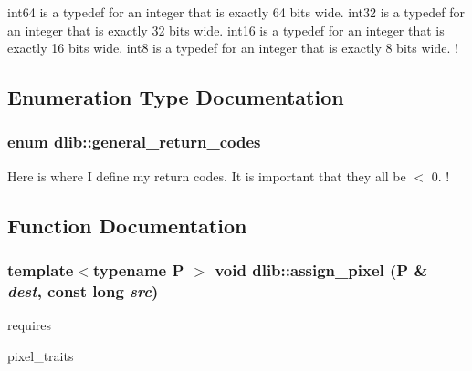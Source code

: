 int64 is a typedef for an integer that is exactly 64 bits wide. int32 is a typedef for an integer that is exactly 32 bits wide. int16 is a typedef for an integer that is exactly 16 bits wide. int8 is a typedef for an integer that is exactly 8 bits wide. ! 

\subsection{Enumeration Type Documentation}
\hypertarget{namespacedlib_a3d0eb509fdefecd0e9f75bab1a0c97d9}{
\subsubsection[{general\_\-return\_\-codes}]{\setlength{\rightskip}{0pt plus 5cm}enum {\bf dlib::general\_\-return\_\-codes}}}
\label{namespacedlib_a3d0eb509fdefecd0e9f75bab1a0c97d9}
Here is where I define my return codes. It is important that they all be $<$ 0. ! 

\subsection{Function Documentation}
\hypertarget{namespacedlib_a5756e98c19859a24eb42d6b906808095}{
\subsubsection[{assign\_\-pixel}]{\setlength{\rightskip}{0pt plus 5cm}template$<$typename P $>$ void dlib::assign\_\-pixel (P \& {\em dest}, \/  const long {\em src})}}
\label{namespacedlib_a5756e98c19859a24eb42d6b906808095}
requires
\begin{DoxyItemize}
\item pixel\_\-traits
\end{DoxyItemize}


